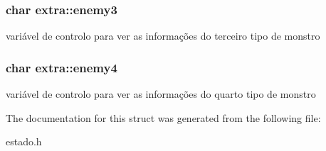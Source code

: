 \subsubsection[{\texorpdfstring{enemy3}{enemy3}}]{\setlength{\rightskip}{0pt plus 5cm}char extra\+::enemy3}\hypertarget{structextra_a9f211725642d5750659098c3420f82e7}{}\label{structextra_a9f211725642d5750659098c3420f82e7}
variável de controlo para ver as informações do terceiro tipo de monstro 
\subsubsection[{\texorpdfstring{enemy4}{enemy4}}]{\setlength{\rightskip}{0pt plus 5cm}char extra\+::enemy4}\hypertarget{structextra_af097e62d6e52792827891bdd9272d95f}{}\label{structextra_af097e62d6e52792827891bdd9272d95f}
variável de controlo para ver as informações do quarto tipo de monstro 

The documentation for this struct was generated from the following file\+:\begin{DoxyCompactItemize}
\item 
estado.\+h\end{DoxyCompactItemize}
